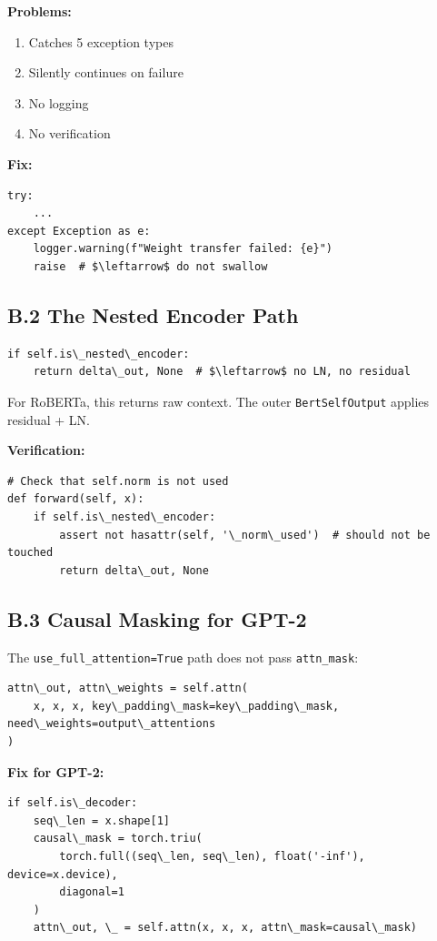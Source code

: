 \textbf{Problems:}
\begin{enumerate}
\item Catches 5 exception types
\item Silently continues on failure
\item No logging
\item No verification

\end{enumerate}
\textbf{Fix:}

\begin{lstlisting}
try:
    ...
except Exception as e:
    logger.warning(f"Weight transfer failed: {e}")
    raise  # $\leftarrow$ do not swallow
\end{lstlisting}

\subsection{B.2 The Nested Encoder Path}

\begin{lstlisting}
if self.is\_nested\_encoder:
    return delta\_out, None  # $\leftarrow$ no LN, no residual
\end{lstlisting}

For RoBERTa, this returns raw context. The outer \texttt{BertSelfOutput} applies 
residual + LN.

\textbf{Verification:}

\begin{lstlisting}
# Check that self.norm is not used
def forward(self, x):
    if self.is\_nested\_encoder:
        assert not hasattr(self, '\_norm\_used')  # should not be touched
        return delta\_out, None
\end{lstlisting}

\subsection{B.3 Causal Masking for GPT-2}

The \texttt{use\_full\_attention=True} path does not pass \texttt{attn\_mask}:

\begin{lstlisting}
attn\_out, attn\_weights = self.attn(
    x, x, x, key\_padding\_mask=key\_padding\_mask, need\_weights=output\_attentions
)
\end{lstlisting}

\textbf{Fix for GPT-2:}

\begin{lstlisting}
if self.is\_decoder:
    seq\_len = x.shape[1]
    causal\_mask = torch.triu(
        torch.full((seq\_len, seq\_len), float('-inf'), device=x.device),
        diagonal=1
    )
    attn\_out, \_ = self.attn(x, x, x, attn\_mask=causal\_mask)
\end{lstlisting}

